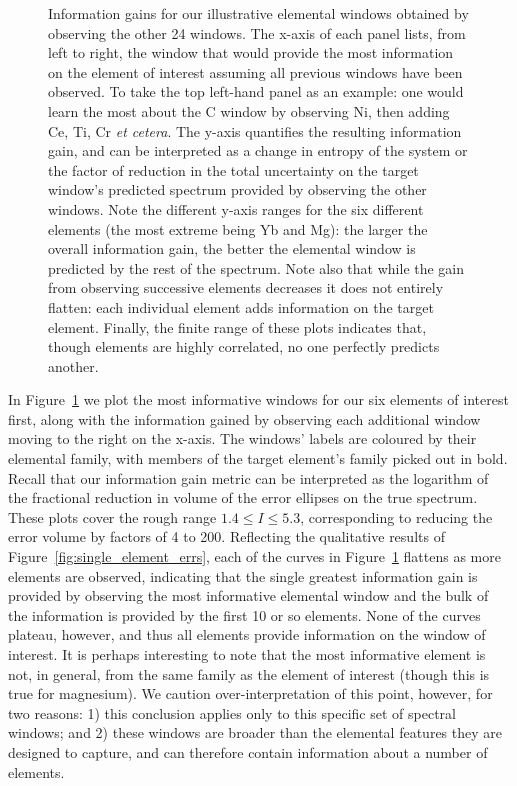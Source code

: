 \documentclass[a4paper,fleqn,usenatbib]{mnras}
\begin{document}
\begin{figure}
    \caption{Information gains for our illustrative elemental windows obtained by observing the other 24 windows. The x-axis of each panel lists, from left to right, the window that would provide the most information on the element of interest assuming all previous windows have been observed. To take the top left-hand panel as an example: one would learn the most about the C window by observing Ni, then adding Ce, Ti, Cr {\it et cetera}. The y-axis quantifies the resulting information gain, and can be interpreted as a change in entropy of the system or the factor of reduction in the total uncertainty on the target window's predicted spectrum provided by observing the other windows. Note the different y-axis ranges for the six different elements (the most extreme being Yb and Mg): the larger the overall information gain, the better the elemental window is predicted by the rest of the spectrum. Note also that while the gain from observing successive elements decreases it does not entirely flatten: each individual element adds information on the target element. Finally, the finite range of these plots indicates that, though elements are highly correlated, no one perfectly predicts another.}
    \label{fig:single_element_information}
\end{figure}


In Figure~\ref{fig:single_element_information} we plot the most informative windows for our six elements of interest first, along with the information gained by observing each additional window moving to the right on the x-axis. The windows' labels are coloured by their elemental family, with members of the target element's family picked out in bold. Recall that our information gain metric can be interpreted as the logarithm of the fractional reduction in volume of the error ellipses on the true spectrum. These plots cover the rough range $1.4 \le I \le 5.3$, corresponding to reducing the error volume by factors of 4 to 200. Reflecting the qualitative results of Figure~\ref{fig:single_element_errs}, each of the curves in Figure~\ref{fig:single_element_information} flattens as more elements are observed, indicating that the single greatest information gain is provided by observing the most informative elemental window and the bulk of the information is provided by the first 10 or so elements. None of the curves plateau, however, and thus all elements provide information on the window of interest. It is perhaps interesting to note that the most informative element is not, in general, from the same family as the element of interest (though this is true for magnesium). We caution over-interpretation of this point, however, for two reasons: 1) this conclusion applies only to this specific set of spectral windows; and 2) these windows are broader than the elemental features they are designed to capture, and can therefore contain information about a number of elements.
\end{document}
